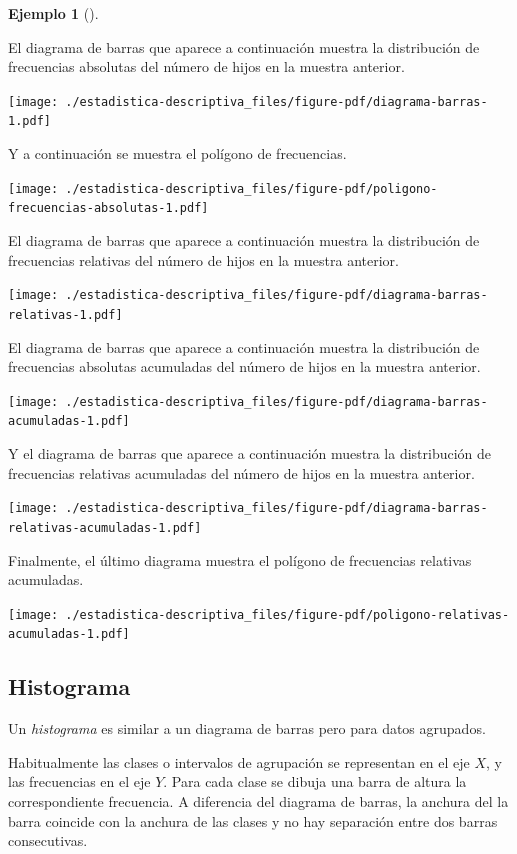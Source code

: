 \documentclass[
  a4paper,
]{scrreport}
\theoremstyle{definition}
\theoremstyle{definition}
\newtheorem{example}{Ejemplo}[chapter]
\theoremstyle{plain}
\theoremstyle{remark}
\begin{document}
\leavevmode{}%
\begin{example}[]\label{exm-diagrama-barras}

El diagrama de barras que aparece a continuación muestra la distribución
de frecuencias absolutas del número de hijos en la muestra anterior.

\texttt{[image: ./estadistica-descriptiva\_files/figure-pdf/diagrama-barras-1.pdf]}

Y a continuación se muestra el polígono de frecuencias.

\texttt{[image: ./estadistica-descriptiva\_files/figure-pdf/poligono-frecuencias-absolutas-1.pdf]}

El diagrama de barras que aparece a continuación muestra la distribución
de frecuencias relativas del número de hijos en la muestra anterior.

\texttt{[image: ./estadistica-descriptiva\_files/figure-pdf/diagrama-barras-relativas-1.pdf]}

El diagrama de barras que aparece a continuación muestra la distribución
de frecuencias absolutas acumuladas del número de hijos en la muestra
anterior.

\texttt{[image: ./estadistica-descriptiva\_files/figure-pdf/diagrama-barras-acumuladas-1.pdf]}

Y el diagrama de barras que aparece a continuación muestra la
distribución de frecuencias relativas acumuladas del número de hijos en
la muestra anterior.

\texttt{[image: ./estadistica-descriptiva\_files/figure-pdf/diagrama-barras-relativas-acumuladas-1.pdf]}

Finalmente, el último diagrama muestra el polígono de frecuencias
relativas acumuladas.

\texttt{[image: ./estadistica-descriptiva\_files/figure-pdf/poligono-relativas-acumuladas-1.pdf]}

\end{example}

\hypertarget{histograma}{%
\subsection{Histograma}\label{histograma}}

Un \emph{histograma} es similar a un diagrama de barras pero para datos
agrupados.

Habitualmente las clases o intervalos de agrupación se representan en el
eje \(X\), y las frecuencias en el eje \(Y\). Para cada clase se dibuja
una barra de altura la correspondiente frecuencia. A diferencia del
diagrama de barras, la anchura del la barra coincide con la anchura de
las clases y no hay separación entre dos barras consecutivas.
\end{document}
